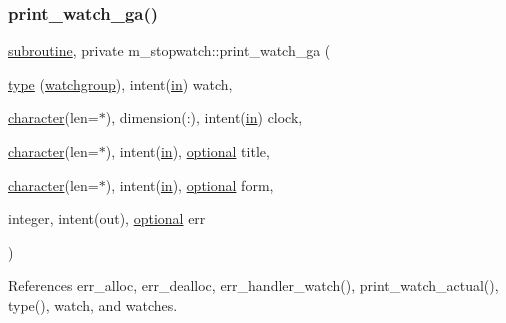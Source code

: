 \subsubsection{\texorpdfstring{print\+\_\+watch\+\_\+ga()}{print\_watch\_ga()}}
{\footnotesize\ttfamily \hyperlink{M__stopwatch_83_8txt_acfbcff50169d691ff02d4a123ed70482}{subroutine}, private m\+\_\+stopwatch\+::print\+\_\+watch\+\_\+ga (\begin{DoxyParamCaption}\item[{\hyperlink{stop__watch_83_8txt_a70f0ead91c32e25323c03265aa302c1c}{type} (\hyperlink{structm__stopwatch_1_1watchgroup}{watchgroup}), intent(\hyperlink{M__journal_83_8txt_afce72651d1eed785a2132bee863b2f38}{in})}]{watch,  }\item[{\hyperlink{option__stopwatch_83_8txt_abd4b21fbbd175834027b5224bfe97e66}{character}(len=$\ast$), dimension(\+:), intent(\hyperlink{M__journal_83_8txt_afce72651d1eed785a2132bee863b2f38}{in})}]{clock,  }\item[{\hyperlink{option__stopwatch_83_8txt_abd4b21fbbd175834027b5224bfe97e66}{character}(len=$\ast$), intent(\hyperlink{M__journal_83_8txt_afce72651d1eed785a2132bee863b2f38}{in}), \hyperlink{option__stopwatch_83_8txt_aa4ece75e7acf58a4843f70fe18c3ade5}{optional}}]{title,  }\item[{\hyperlink{option__stopwatch_83_8txt_abd4b21fbbd175834027b5224bfe97e66}{character}(len=$\ast$), intent(\hyperlink{M__journal_83_8txt_afce72651d1eed785a2132bee863b2f38}{in}), \hyperlink{option__stopwatch_83_8txt_aa4ece75e7acf58a4843f70fe18c3ade5}{optional}}]{form,  }\item[{integer, intent(out), \hyperlink{option__stopwatch_83_8txt_aa4ece75e7acf58a4843f70fe18c3ade5}{optional}}]{err }\end{DoxyParamCaption})\hspace{0.3cm}{\ttfamily [private]}}



References err\+\_\+alloc, err\+\_\+dealloc, err\+\_\+handler\+\_\+watch(), print\+\_\+watch\+\_\+actual(), type(), watch, and watches.

\mbox{\label{namespacem__stopwatch_ab397616c3f1dfa3c10e4587356de3d70}} 
